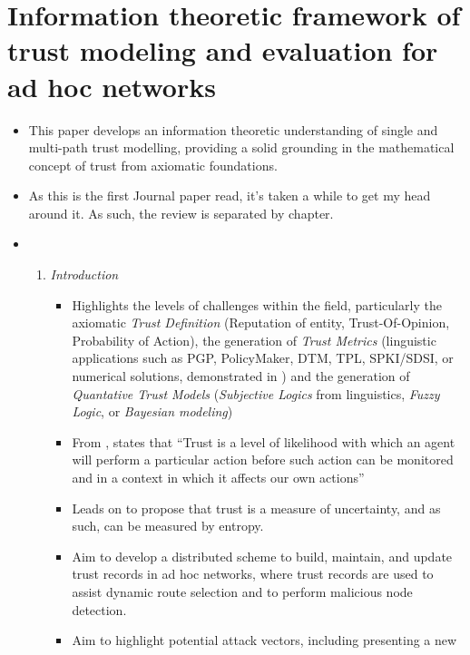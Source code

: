 \section{Information theoretic framework of trust modeling and evaluation for
ad hoc networks \citet*{Liu2006}}
\label{Liu2006_gen}
\begin{itemize}
  \item This paper develops an information theoretic understanding of single and
    multi-path trust modelling, providing a solid grounding in the mathematical
    concept of trust from axiomatic foundations.
  \item As this is the first Journal paper read, it's taken a while to get my
    head around it. As such, the review is separated by chapter.
  \item 
    \begin{enumerate}
      \item \emph{Introduction}
        \begin{itemize}
          \item Highlights the levels of challenges within the field, particularly
            the axiomatic \emph{Trust Definition} (Reputation of entity, Trust-Of-Opinion,
            Probability of Action), the generation of \emph{Trust Metrics}
            (linguistic applications such as PGP, PolicyMaker, DTM, TPL, SPKI/SDSI, or
            numerical solutions, demonstrated in
            \cite{Abdul-Rahman1997}
            \cite{Theodorakopoulos2004}\cite{Maurer1996})
            and the generation of \emph{Quantative Trust Models}
            (\emph{Subjective Logics} from linguistics, \emph{Fuzzy Logic}, or
            \emph{Bayesian modeling})
          \item From \cite{Gambetta2000}, states that ``Trust is a level of likelihood with which an
            agent will perform a particular action before such action can be monitored
            and in a context in which it affects our own actions''
          \item Leads on to propose that trust is a measure of uncertainty, and as
            such, can be measured by entropy.
          \item Aim to develop a distributed scheme to build, maintain, and update
            trust records in ad hoc networks, where trust records are used to assist
            dynamic route selection and to perform malicious node detection.
          \item Aim to highlight potential attack vectors, including presenting a new

\end{itemize}
\end{enumerate}
\end{itemize}
